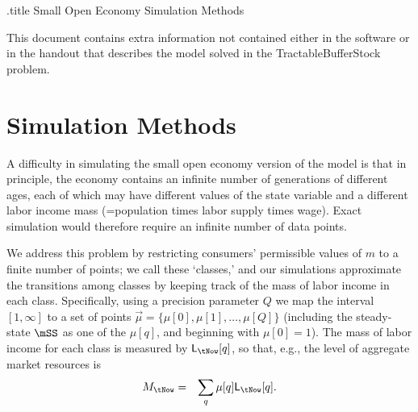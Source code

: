 \documentclass{handout}
\begin{document}
\handoutHeader

\begin{verbatimwrite}{\jobname.title}
Small Open Economy Simulation Methods
\end{verbatimwrite}

\handoutNameMake

\newcommand{\Classes}{Q}
\newcommand{\class}{q}
\newcommand{\mclass}{\mu}
\newcommand{\mqNext}{m_{+}}
\newcommand{\uKoppa}{\underline{\koppa}}
\newcommand{\StakeClass}{\koppa}
\newcommand{\Stake}{S}
\newcommand{\LMass}{\mathsf{L}}
\newcommand{\lmass}{\ensuremath{\mathcal{L}}}

This document contains extra information not contained either in the software or in the handout 
that describes the model solved in the TractableBufferStock problem. 

\section{Simulation Methods}

A difficulty in simulating the small open economy version of the model is
that in principle, the economy contains an infinite number of
generations of different ages, each of which may have 
different values of the state variable and a different labor income
mass (=population times labor supply times wage).  Exact simulation
would therefore require an infinite number of data points.

We address this problem by restricting consumers' permissible values
of $m$ to a finite number of points; we call these `classes,' and our
simulations approximate the transitions among classes by keeping track
of the mass of labor income in each class.  Specifically, using a
precision parameter $\Classes$ we map the interval $[1,\infty]$ to a
set of points $\vec{\mclass} = \{\mclass[0],\mclass[1],\ldots,\mclass[\Classes]\}$
(including the steady-state $\mSS$ as one of the $\mclass[\class]$, and beginning
with $\mclass[0]=1$).  The mass of labor income for each
class is measured by
$\LMass_{\tNow}[\class]$, so that, e.g., the level of aggregate
market resources is
\begin{equation}\begin{gathered}\begin{aligned}
  {M}_{\tNow} & = & \sum_{\class} \mclass[\class] \LMass_{\tNow}[\class]
.
\end{aligned}\end{gathered}\end{equation}
\end{document}
